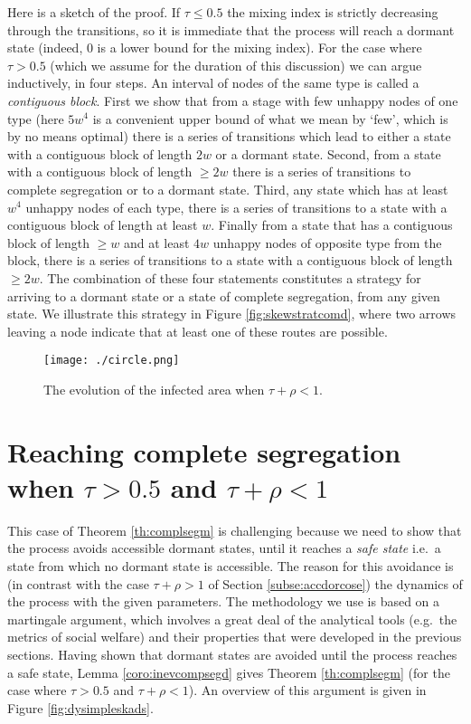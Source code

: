 \documentclass[11pt]{article}
\theoremstyle{plain}
\numberwithin{equation}{subsection}
\begin{document}
Here is a sketch of the proof.
If $\tau\leq 0.5$ the mixing index is strictly decreasing through the transitions, so it is immediate
that the process will reach a dormant state (indeed, 0 is a lower bound for the mixing index).
For the case where $\tau>0.5$ (which we assume for the duration of this discussion) we can argue
inductively, in four steps. 
An interval of nodes of the same type is called a {\em contiguous block}. 
First we show that
from a stage with few unhappy nodes of one type (here $5w^4$ is a convenient upper bound of
what we mean by `few', which is by no means optimal) there is a series of transitions which lead to either
a state with a contiguous block of length $2w$ or a dormant state.
Second, 
from a state with a contiguous block of length $\geq 2w$
there is a series of transitions to complete segregation or to a dormant state.
Third,
any state which has at least $w^4$ unhappy nodes of each type,
there is a series of transitions to a state with a contiguous 
block of length at least $w$.
Finally 
from a state that has a contiguous block  of length $\geq w$
and at least $4w$ unhappy nodes of opposite type from the block,  there is a series of
transitions to a state with a contiguous block  of length $\geq 2w$.
The combination of these four statements constitutes a strategy for arriving to a dormant state or
a state of complete segregation, from any given state.
We illustrate this strategy in Figure \ref{fig:skewstratcomd}, where
two arrows leaving a node indicate that at least one of these routes are possible.

 \begin{figure} 
\centering\texttt{[image: ./circle.png]}
\caption{The evolution of the infected area when $\tau+\rho<1$.}\label{fig:cicle_slides}
\end{figure}  


\section{Reaching complete segregation \texorpdfstring{when $\tau>0.5$ and  $\tau+\rho<1$}{in the hard case}}\label{se:recomsehaca}
This case of Theorem \ref{th:complsegm} is challenging because we need to show that the process avoids accessible dormant states, until it reaches a {\em safe state}
i.e.\ a state from which no dormant state is accessible.
The reason for this avoidance is (in contrast with the case $\tau+\rho>1$ of Section \ref{subse:accdorcose}) 
the dynamics of the process with the given parameters.
The methodology we use is based on a martingale argument, which involves a great deal of the analytical tools 
(e.g.\ the metrics of social welfare) and their properties that were developed in the previous sections.
Having shown that dormant states are avoided until the process reaches a safe state, Lemma \ref{coro:inevcompsegd} gives
Theorem \ref{th:complsegm} (for the case where $\tau>0.5$ and  $\tau+\rho<1$). An overview of this argument is given in Figure \ref{fig:dysimpleskads}.
\end{document}
